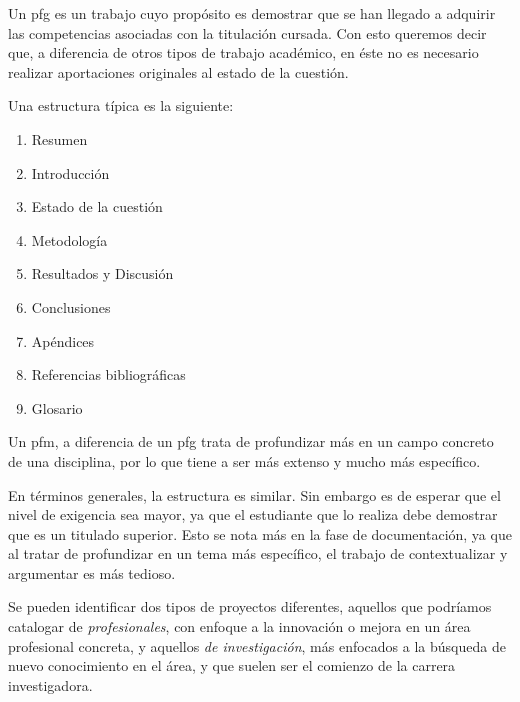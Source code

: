Un \gls{pfg} es un trabajo cuyo propósito es demostrar que se han llegado a adquirir las competencias asociadas con la titulación cursada. Con esto queremos decir que, a diferencia de otros tipos de trabajo académico, en éste no es necesario realizar aportaciones originales al estado de la cuestión.

Una estructura típica es la siguiente:

\begin{enumerate}
    \item Resumen
    \item Introducción
    \item Estado de la cuestión
    \item Metodología
    \item Resultados y Discusión
    \item Conclusiones
    \item Apéndices
    \item Referencias bibliográficas
    \item Glosario
\end{enumerate}

Un \gls{pfm}, a diferencia de un \gls{pfg} trata de profundizar más en un campo concreto de una disciplina, por lo que tiene a ser más extenso y mucho más específico.

En términos generales, la estructura es similar. Sin embargo es de esperar que el nivel de exigencia sea mayor, ya que el estudiante que lo realiza debe demostrar que es un titulado superior. Esto se nota más en la fase de documentación, ya que al tratar de profundizar en un tema más específico, el trabajo de contextualizar y argumentar es más tedioso.

Se pueden identificar dos tipos de proyectos diferentes, aquellos que podríamos catalogar de \textit{profesionales}, con enfoque a la innovación o mejora en un área profesional concreta, y aquellos \textit{de investigación}, más enfocados a la búsqueda de nuevo conocimiento en el área, y que suelen ser el comienzo de la carrera investigadora.
